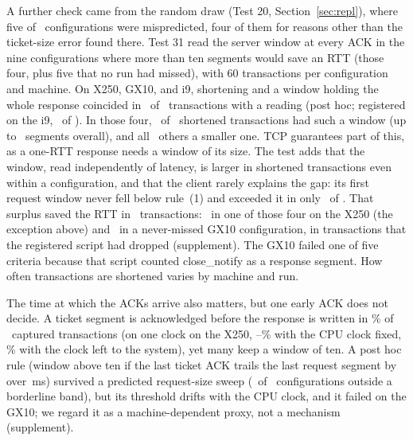 \documentclass[sigconf,9pt,nonacm]{acmart}
\newcommand{\ms}{\,ms\xspace}
\begin{document}
A further check came from the random draw (Test 20, Section~\ref{sec:repl}), where five of \GnineN\ configurations were mispredicted, four of them for reasons other than the ticket-size error found there. Test 31 read the server window at every ACK in the nine configurations where more than ten segments would save an RTT (those four, plus five that no run had missed), with 60 transactions per configuration and machine. On X250, GX10, and i9, shortening and a window holding the whole response coincided in \GtfAgree\ of \GtfW\ transactions with a reading (post hoc; registered on the i9, \GtfIAgree\ of \GtfIW). In those four, \GtfUFastFit\ of \GtfUFast\ shortened transactions had such a window (up to \GtfWinMax\ segments overall), and all \GtfUSlow\ others a smaller one. TCP guarantees part of this, as a one-RTT response needs a window of its size. The test adds that the window, read independently of latency, is larger in shortened transactions even within a configuration, and that the client rarely explains the gap: its first request window never fell below rule~(1) and exceeded it in only \GtfLarger\ of \GtfN. That surplus saved the RTT in \GtfReqSaved\ transactions: \GtfXReqSaved\ in one of those four on the X250 (the exception above) and \GtfGxReqSaved\ in a never-missed GX10 configuration, in transactions that the registered script had dropped (supplement). The GX10 failed one of five criteria because that script counted close\_notify as a response segment. How often transactions are shortened varies by machine and run.

The time at which the ACKs arrive also matters, but one early ACK does not decide. A ticket segment is acknowledged before the response is written in \RaceBeforePct\% of \RaceN\ captured transactions (on one clock on the X250, \RqKSixPct--\RpKSixPct\% with the CPU clock fixed, \RuKSixPct\% with the clock left to the system), yet many keep a window of ten. A post hoc rule (window above ten if the last ticket ACK trails the last request segment by over \RaceThr\ms) survived a predicted request-size sweep (\RaceTwoRight\ of \RaceTwoScored\ configurations outside a borderline band), but its threshold drifts with the CPU clock, and it failed on the GX10; we regard it as a machine-dependent proxy, not a mechanism (supplement).
\end{document}
